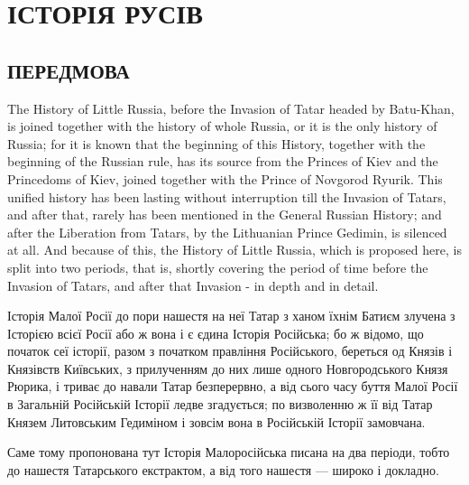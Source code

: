  
 
 
 
 

\chapter{ІСТОРІЯ РУСІВ}


\section{ПЕРЕДМОВА}

The History of Little Russia, before the Invasion of Tatar headed by Batu-Khan,
is joined together with the history of whole Russia, or it is the only history
of Russia; for it is known that the beginning of this History, together with
the beginning of the Russian rule, has its source from the Princes of Kiev and
the Princedoms of Kiev, joined together with the Prince of Novgorod Ryurik.
This unified history has been lasting without interruption till the Invasion of
Tatars, and after that, rarely has been mentioned in the General Russian
History; and after the Liberation from Tatars, by the Lithuanian Prince
Gedimin, is  silenced at all. And because of this, the History of Little
Russia, which is proposed here, is split into two periods, that is, shortly covering
the period of time before the Invasion of Tatars, and after that Invasion - in depth
and in detail.

Історія Малої Росії до пори нашестя на неї Татар з ханом їхнім Батиєм злучена з
Історією всієї Росії або ж вона і є єдина Історія Російська; бо ж відомо, що
початок сеї історії, разом з початком правління Російського, береться од Князів
і Князівств Київських, з прилученням до них лише одного Новгородського Князя
Рюрика, і триває до навали Татар безперервно, а від сього часу буття Малої
Росії в Загальній Російській Історії ледве згадується; по визволенню ж її від
Татар Князем Литовським Гедиміном і зовсім вона в Російській Історії замовчана.

Саме тому пропонована тут Історія Малоросійська писана на два періоди, тобто до
нашестя Татарського екстрактом, а від того нашестя — широко і докладно.

